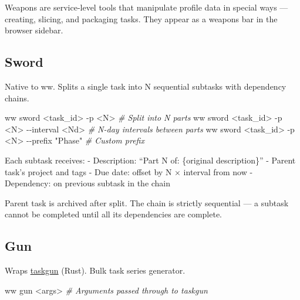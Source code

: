 \documentclass[11pt, a4paper, DIV=14]{scrartcl}
\newenvironment{Shaded}{%
  \vspace{4pt}%
  \begin{lrbox}{\ShadedBox}%
  \begin{minipage}{\dimexpr\linewidth-2\fboxsep\relax}%
  \vspace{4pt}%
}{%
  \vspace{4pt}%
  \end{minipage}%
  \end{lrbox}%
  \noindent\colorbox{CodeBg}{\usebox{\ShadedBox}}%
  \par\vspace{4pt}%
}
\newcommand{\CommentTok}[1]{\textcolor{BabbGray}{\textit{#1}}}
\newcommand{\ExtensionTok}[1]{#1}
\newcommand{\NormalTok}[1]{#1}
\newcommand{\OperatorTok}[1]{#1}
\newcommand{\StringTok}[1]{#1}
\newenvironment{Highlighting}{\ttfamily\fontsize{8.2}{11}\selectfont}{}
\begin{document}
Weapons are service-level tools that manipulate profile data in special
ways --- creating, slicing, and packaging tasks. They appear as a
weapons bar in the browser sidebar.

\subsection{Sword}\label{sword}

Native to ww. Splits a single task into N sequential subtasks with
dependency chains.

\begin{Shaded}
\begin{Highlighting}[]
\ExtensionTok{ww}\NormalTok{ sword }\OperatorTok{\textless{}}\NormalTok{task\_id}\OperatorTok{\textgreater{}}\NormalTok{ {-}p }\OperatorTok{\textless{}}\NormalTok{N}\OperatorTok{\textgreater{}}                   \CommentTok{\# Split into N parts}
\ExtensionTok{ww}\NormalTok{ sword }\OperatorTok{\textless{}}\NormalTok{task\_id}\OperatorTok{\textgreater{}}\NormalTok{ {-}p }\OperatorTok{\textless{}}\NormalTok{N}\OperatorTok{\textgreater{}}\NormalTok{ {-}{-}interval }\OperatorTok{\textless{}}\NormalTok{Nd}\OperatorTok{\textgreater{}}   \CommentTok{\# N{-}day intervals between parts}
\ExtensionTok{ww}\NormalTok{ sword }\OperatorTok{\textless{}}\NormalTok{task\_id}\OperatorTok{\textgreater{}}\NormalTok{ {-}p }\OperatorTok{\textless{}}\NormalTok{N}\OperatorTok{\textgreater{}}\NormalTok{ {-}{-}prefix }\StringTok{"Phase"}  \CommentTok{\# Custom prefix}
\end{Highlighting}
\end{Shaded}

Each subtask receives: - Description: ``Part N of: \{original
description\}'' - Parent task's project and tags - Due date: offset by N
× interval from now - Dependency: on previous subtask in the chain

Parent task is archived after split. The chain is strictly sequential
--- a subtask cannot be completed until all its dependencies are
complete.

\subsection{Gun}\label{gun}

Wraps \href{https://github.com/hamzamohdzubair/taskgun}{taskgun} (Rust).
Bulk task series generator.

\begin{Shaded}
\begin{Highlighting}[]
\ExtensionTok{ww}\NormalTok{ gun }\OperatorTok{\textless{}}\NormalTok{args}\OperatorTok{\textgreater{}}   \CommentTok{\# Arguments passed through to taskgun}
\end{Highlighting}
\end{Shaded}
\end{document}
